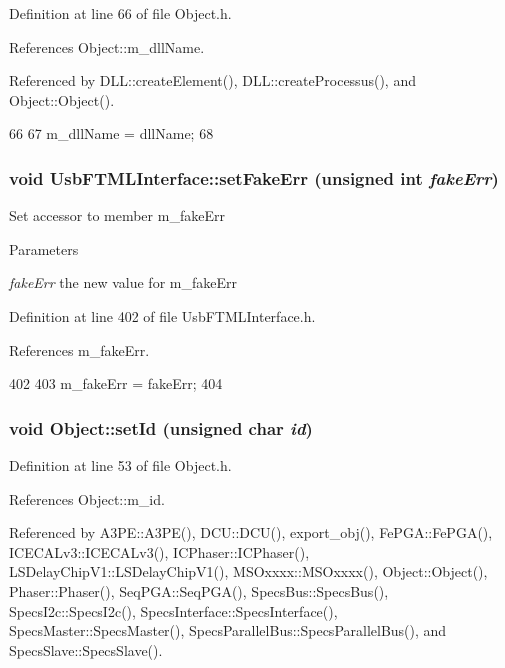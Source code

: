Definition at line 66 of file Object.h.

References Object::m\_\-dllName.

Referenced by DLL::createElement(), DLL::createProcessus(), and Object::Object().


\begin{DoxyCode}
66                                       {
67     m_dllName = dllName;
68   }
\end{DoxyCode}
\hypertarget{classUsbFTMLInterface_a01a8080338c5de181ad70b7506c97bc4}{
\subsubsection[{setFakeErr}]{\setlength{\rightskip}{0pt plus 5cm}void UsbFTMLInterface::setFakeErr (unsigned int {\em fakeErr})}}
\label{classUsbFTMLInterface_a01a8080338c5de181ad70b7506c97bc4}
Set accessor to member m\_\-fakeErr 
\begin{DoxyParams}{Parameters}
\item[{\em fakeErr}]the new value for m\_\-fakeErr \end{DoxyParams}


Definition at line 402 of file UsbFTMLInterface.h.

References m\_\-fakeErr.


\begin{DoxyCode}
402                                          {
403     m_fakeErr = fakeErr;
404   }
\end{DoxyCode}
\hypertarget{classObject_a398fe08cba594a0ce6891d59fe4f159f}{
\subsubsection[{setId}]{\setlength{\rightskip}{0pt plus 5cm}void Object::setId (unsigned char {\em id})}}
\label{classObject_a398fe08cba594a0ce6891d59fe4f159f}


Definition at line 53 of file Object.h.

References Object::m\_\-id.

Referenced by A3PE::A3PE(), DCU::DCU(), export\_\-obj(), FePGA::FePGA(), ICECALv3::ICECALv3(), ICPhaser::ICPhaser(), LSDelayChipV1::LSDelayChipV1(), MSOxxxx::MSOxxxx(), Object::Object(), Phaser::Phaser(), SeqPGA::SeqPGA(), SpecsBus::SpecsBus(), SpecsI2c::SpecsI2c(), SpecsInterface::SpecsInterface(), SpecsMaster::SpecsMaster(), SpecsParallelBus::SpecsParallelBus(), and SpecsSlave::SpecsSlave().


